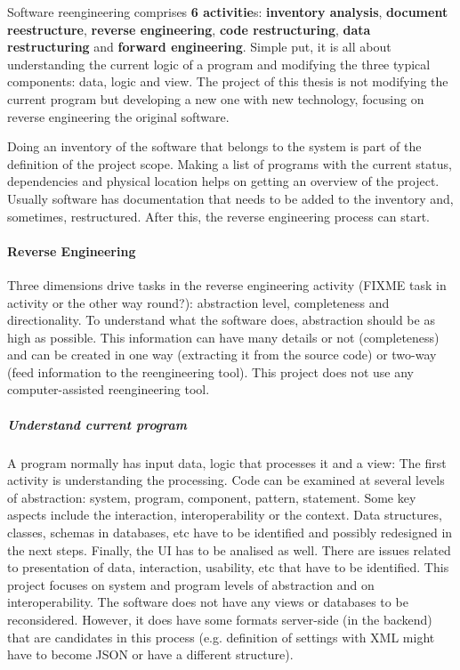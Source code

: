 Software reengineering comprises \textbf{6 activitie}s: \textbf{inventory analysis}, \textbf{document reestructure}, \textbf{reverse engineering}, \textbf{code restructuring}, \textbf{data restructuring} and \textbf{forward engineering}.
Simple put, it is all about understanding the current logic of a program and modifying the three typical components: data, logic and view.
The project of this thesis is not modifying the current program but developing a new one with new technology, focusing on reverse engineering the original software. 

Doing an inventory of the software that belongs to the system is part of the definition of the project scope.
Making a list of programs with the current status, dependencies and physical location helps on getting an overview of the project.
Usually software has documentation that needs to be added to the inventory and, sometimes, restructured.
After this, the reverse engineering process can start.

\paragraph{Reverse Engineering}
Three dimensions drive tasks in the reverse engineering activity (FIXME task in activity or the other way round?): abstraction level, completeness and directionality.
To understand what the software does, abstraction should be as high as possible.
This information can have many details or not (completeness) and can be created in one way (extracting it from the source code) or two-way (feed information to the reengineering tool).
This project does not use any computer-assisted reengineering tool.

\subparagraph{Understand current program}
A program normally has input data, logic that processes it and a view:
The first activity is understanding the processing.
Code can be examined at several levels of abstraction: system, program, component, pattern, statement.
Some key aspects include the interaction, interoperability or the context.
Data structures, classes, schemas in databases, etc have to be identified and possibly redesigned in the next steps.
Finally, the \ac{UI} has to be analised as well. 
There are issues related to presentation of data, interaction, usability, etc that have to be identified.
This project focuses on system and program levels of abstraction and on interoperability.
The software does not have any views or databases to be reconsidered.
However, it does have some formats server-side (in the backend) that are candidates in this process (e.g. definition of settings with \ac{XML} might have to become \ac{JSON} or have a different structure).

